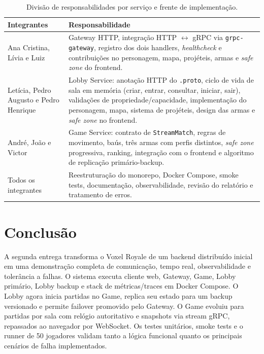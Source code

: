 \documentclass[portuguese]{sbcreviews-2025}%
\begin{document}
\begin{table}[ht]
\centering
\caption{Divisão de responsabilidades por serviço e frente de implementação.}
\label{tab:equipes}
\scriptsize
\begin{tabularx}{\columnwidth}{|X|X|}
\hline
\textbf{Integrantes} & \textbf{Responsabilidade} \\ \hline
Ana Cristina, Lívia e Luiz &
Gateway HTTP, integração HTTP $\leftrightarrow$ gRPC via \texttt{grpc-gateway}, registro dos dois handlers, \textit{healthcheck} e contribuições no personagem, mapa, projéteis, armas e \textit{safe zone} do frontend. \\ \hline
Letícia, Pedro Augusto e Pedro Henrique &
Lobby Service: anotação HTTP do \texttt{.proto}, ciclo de vida de sala em memória (criar, entrar, consultar, iniciar, sair), validações de propriedade/capacidade, implementação do personagem, mapa, sistema de projéteis, design das armas e \textit{safe zone} no frontend. \\ \hline
André, João e Victor &
Game Service: contrato de \texttt{StreamMatch}, regras de movimento, baús, três armas com perfis distintos, \textit{safe zone} progressiva, ranking, integração com o frontend e algoritmo de replicação primário-backup. \\ \hline
Todos os integrantes &
Reestruturação do monorepo, Docker Compose, smoke tests, documentação, observabilidade, revisão do relatório e tratamento de erros. \\ \hline
\end{tabularx}
\end{table}

\section{Conclusão}

A segunda entrega transforma o Voxel Royale de um backend distribuído inicial em uma demonstração completa de comunicação, tempo real, observabilidade e tolerância a falhas. O sistema executa cliente web, Gateway, Game, Lobby primário, Lobby backup e stack de métricas/traces em Docker Compose. O Lobby agora inicia partidas no Game, replica seu estado para um backup versionado e permite failover promovido pelo Gateway. O Game evoluiu para partidas por sala com relógio autoritativo e snapshots via stream gRPC, repassados ao navegador por WebSocket. Os testes unitários, smoke tests e o runner de 50 jogadores validam tanto a lógica funcional quanto os principais cenários de falha implementados.
\end{document}
